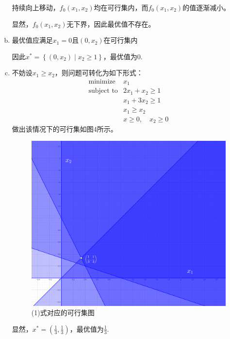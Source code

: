 \documentclass[10pt, a4paper]{article}
\begin{document}
\begin{enumerate}[(a)]
    持续向上移动，$f_{0}\left(x_{1}, x_{2}\right)$均在可行集内，而$f_{0}\left(x_{1}, x_{2}\right)$的值逐渐减小。

    显然，$f_{0}\left(x_{1}, x_{2}\right)$无下界，因此最优值不存在。

    \item 最优值应满足$x_{1}=0$且$(0,x_{2})$在可行集内
    
    因此$x^{*}=\left\{\left(0, x_{2}\right) \mid x_{2} \geq 1\right\}$，最优值为0.

    \item 不妨设$x_{1} \ge x_{2}$，则问题可转化为如下形式：
    \begin{equation}
        \begin{array}{ll}
        \operatorname{minimize} & x_{1} \\
        \text {subject to} & 2 x_{1}+x_{2} \geq 1 \\
        & x_{1}+3 x_{2} \geq 1 \\
        & x_{1} \geq x_{2} \\
        & x \geq 0, \quad x_{2} \geq 0
        \end{array}
    \end{equation}
    做出该情况下的可行集如图4所示。
    \begin{figure}[H]
        \centering
        \includegraphics[scale=0.18]{p4.png}
        \caption{(1)式对应的可行集图}
    \end{figure}

    显然，$x^{*}= \left ( \frac{1}{3} ,\frac{1}{3}  \right ) $，最优值为$\frac{1}{3}$.


\end{enumerate}
\end{document}

